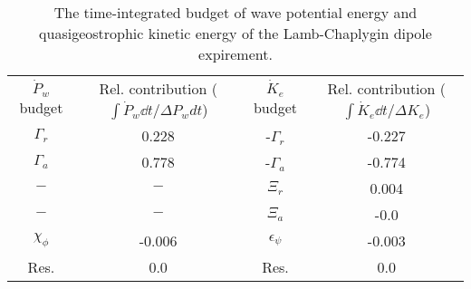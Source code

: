 \begin{table}
\begin{center}
\caption{The time-integrated budget of wave potential energy and quasigeostrophic                kinetic energy of the Lamb-Chaplygin dipole expirement. \label{table1}}
\begin{tabular}{cccc}
$\dot{P}_w$ budget & Rel. contribution ($\int\dot{P}_w \dd t/\Delta P_w dt$) & $\dot{K}_e$ budget & Rel. contribution ($\int\dot{K}_e \dd t/\Delta K_e$) \\
$\Gamma_r$ & 0.228 & -$\Gamma_r$ & -0.227 \\
$\Gamma_a$ & 0.778 & -$\Gamma_a$ & -0.774 \\
$-$ & $-$ & $\Xi_r$ & 0.004 \\
$-$ & $-$ & $\Xi_a$ & -0.0 \\
$\chi_\phi$ & -0.006 & $\epsilon_\psi$ & -0.003 \\
Res. & 0.0 & Res. & 0.0 \\
\end{tabular}
\end{center}
\end{table}
